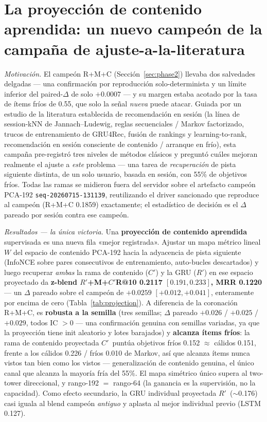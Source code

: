 \documentclass[11pt]{article}
\newcommand{\dsid}[1]{\texttt{\small #1}}
\newcommand{\Rp}{\ensuremath{R'}}
\newcommand{\Cp}{\ensuremath{C'}}
\begin{document}
\section{La proyección de contenido aprendida: un nuevo campeón de la campaña de ajuste-a-la-literatura}
\label{sec:projection}
\emph{Motivación.} El campeón R+M+C (Sección~\ref{sec:phase2}) llevaba dos
salvedades delgadas --- una confirmación por reproducción solo-determinista y un
límite inferior del paired-$\Delta$ de solo $+\num{0.0007}$ --- y su margen estaba
acotado por la tasa de ítems fríos de \num{0.55}, que solo la señal \emph{nueva}
puede atacar. Guiada por un estudio de la literatura establecida de recomendación
en sesión (la línea de session-kNN de Jannach--Ludewig, reglas secuenciales /
Markov factorizado, trucos de entrenamiento de GRU4Rec, fusión de rankings y
learning-to-rank, recomendación en sesión consciente de contenido / arranque en
frío), esta campaña pre-registró tres niveles de métodos clásicos y preguntó
cuáles mejoran realmente el ajuste a \emph{este} problema --- una tarea de
\emph{recuperación} de pista siguiente distinta, de un solo usuario, basada en
sesión, con 55\% de objetivos fríos. Todas las ramas se midieron fuera del
servidor sobre el artefacto campeón PCA-192 \dsid{seq-20260715-131139},
reutilizando el driver sancionado que reproduce al campeón (R+M+C \num{0.1859})
exactamente; el estadístico de decisión es el $\Delta$ pareado por sesión contra
ese campeón.

\emph{Resultados --- la única victoria.} Una \textbf{proyección de contenido
aprendida} supervisada es una nueva fila «mejor registrada». Ajustar un mapa
métrico lineal $W$ del espacio de contenido PCA-192 hacia la adyacencia de pista
siguiente (InfoNCE sobre pares consecutivos de entrenamiento, auto-bucles
descartados) y luego recuperar \emph{ambas} la rama de contenido (\Cp) y la GRU
(\Rp) en ese espacio proyectado da \textbf{z-blend \Rp+M+\Cp R@10 \num{0.2117}
$[0.191, 0.233]$, MRR \num{0.1220}} --- un $\Delta$ pareado sobre el campeón de
$+\num{0.0259}$ $[+0.012, +0.041]$, enteramente por encima de cero
(Tabla~\ref{tab:projection}). A diferencia de la coronación R+M+C, es
\textbf{robusta a la semilla} (tres semillas; $\Delta$ pareado $+\num{0.026}$ /
$+\num{0.025}$ / $+\num{0.029}$, todos IC $>0$ --- una confirmación genuina con
semillas variadas, ya que la proyección tiene init aleatorio y lotes barajados) y
\textbf{alcanza ítems fríos}: la rama de contenido proyectada \Cp\ puntúa
objetivos fríos \num{0.152} $\approx$ cálidos \num{0.151}, frente a los cálidos
\num{0.226} / fríos \num{0.010} de Markov, así que alcanza ítems nunca vistos tan
bien como los vistos --- generalización de contenido genuina, el único canal que
alcanza la mayoría fría del 55\%. El mapa simétrico único supera al two-tower
direccional, y rango-192 $=$ rango-64 (la ganancia es la supervisión, no la
capacidad). Como efecto secundario, la GRU individual proyectada \Rp\
($\sim$\num{0.176}) casi iguala al blend campeón \emph{antiguo} y aplasta al mejor
individual previo (LSTM \num{0.127}).
\end{document}

